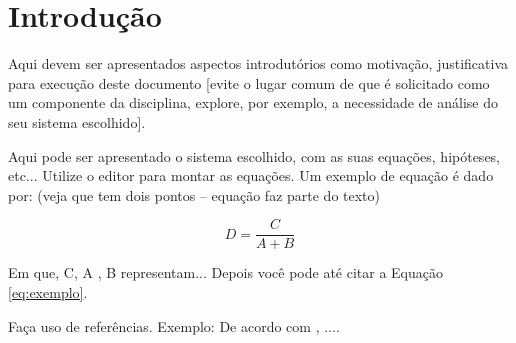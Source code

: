 \section{Introdução}

Aqui devem ser apresentados aspectos introdutórios como motivação, justificativa para execução deste documento [evite o lugar comum de que é solicitado como um componente da disciplina, explore, por exemplo, a necessidade de análise do seu sistema escolhido].

Aqui pode ser apresentado o sistema escolhido, com as suas equações, hipóteses, etc...
Utilize o editor para montar as equações.
Um exemplo de equação é dado por: (veja que tem dois pontos – equação faz parte do texto)

\begin{equation}
  D = \frac{C}{A + B}
  \label{eq:exemplo}
\end{equation}

Em que, C, A , B representam... Depois você pode até citar a Equação \ref{eq:exemplo}.

Faça uso de referências. Exemplo: De acordo com \textcite{santana_2017}, ....

